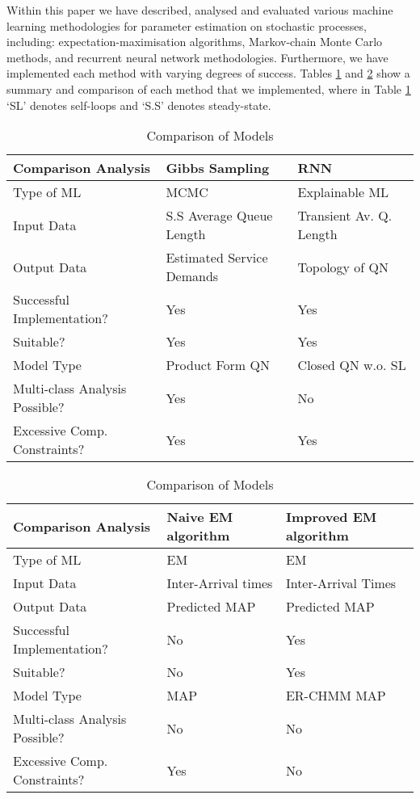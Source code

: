 \documentclass[a4paper,11pt,titlepage]{article}
\begin{document}
Within this paper we have described, analysed and evaluated various machine learning methodologies for parameter estimation on stochastic processes, including: expectation-maximisation algorithms, Markov-chain Monte Carlo methods, and recurrent neural network methodologies. Furthermore, we have implemented each method with varying degrees of success. Tables \ref{tab:comparison_models} and \ref{tab:comparison_models2} show a summary and comparison of each method that we implemented, where in Table \ref{tab:comparison_models} `SL' denotes self-loops and `S.S' denotes steady-state. \\

\begin{table}[h!]
\begin{tabular}{|l|l|l|}
\hline
\textbf{Comparison Analysis} & \textbf{Gibbs Sampling} & \textbf{RNN} \\ \hline
Type of ML & MCMC & Explainable ML \\ \hline
Input Data & S.S Average Queue Length & Transient Av. Q. Length \\ \hline
Output Data & Estimated Service Demands & Topology of QN \\ \hline
Successful Implementation? & Yes & Yes \\ \hline
Suitable? & Yes & Yes \\ \hline
Model Type & Product Form QN & Closed QN w.o. SL \\ \hline
Multi-class Analysis Possible? & Yes & No \\ \hline
Excessive Comp. Constraints? & Yes & Yes \\ \hline
\end{tabular}
\caption{Comparison of Models}
\label{tab:comparison_models}
\end{table}

\begin{table}[h!]
\begin{tabular}{|l|l|l|}
\hline
\textbf{Comparison Analysis} & \textbf{Naive EM algorithm} & \textbf{Improved EM algorithm} \\ \hline
Type of ML & EM & EM \\ \hline
Input Data & Inter-Arrival times & Inter-Arrival Times \\ \hline
Output Data & Predicted MAP & Predicted MAP \\ \hline
Successful Implementation? & No & Yes \\ \hline
Suitable? & No & Yes \\ \hline
Model Type & MAP & ER-CHMM MAP \\ \hline
Multi-class Analysis Possible? & No & No \\ \hline
Excessive Comp. Constraints? & Yes & No \\ \hline
\end{tabular}
\caption{Comparison of Models}
\label{tab:comparison_models2}
\end{table}
\end{document}
